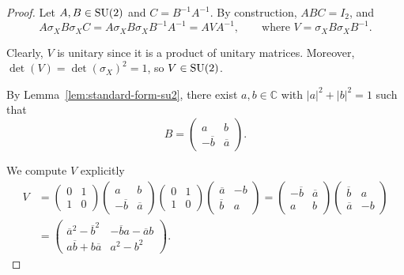 \documentclass[a4paper, oneside, 12pt]{amsart}
\begin{document}
\begin{proof}
  Let \( A, B \in \operatorname{SU}(2) \) and \( C = B^{-1} A^{-1} \).
  By construction, \( ABC = I_2 \), and
  \begin{equation*}
    A \sigma_X B \sigma_X C
    = A \sigma_X B \sigma_X B^{-1} A^{-1}
    = A V A^{-1}, \qquad \text{where } V = \sigma_X B \sigma_X B^{-1}.
  \end{equation*}

  Clearly, \( V \) is unitary since it is a product of unitary matrices. Moreover, \( \det(V) = \det(\sigma_X)^2 = 1 \), so \( V \in \operatorname{SU}(2) \).

  By Lemma~\ref{lem:standard-form-su2}, there exist \( a, b \in \mathbb{C} \) with \( |a|^2 + |b|^2 = 1 \) such that
  \begin{equation*}
    B = \begin{pmatrix} a & b \\ -\overline{b} & \overline{a} \end{pmatrix}.
  \end{equation*}

  We compute \( V \) explicitly
  \begin{align*}
    V & =
        \begin{pmatrix} 0 & 1 \\ 1 & 0 \end{pmatrix}
        \begin{pmatrix} a & b \\ -\overline{b} & \overline{a} \end{pmatrix}
        \begin{pmatrix} 0 & 1 \\ 1 & 0 \end{pmatrix}
        \begin{pmatrix} \overline{a} & -b \\ \overline{b} & a \end{pmatrix}
        =
        \begin{pmatrix} -\overline{b} & \overline{a} \\ a & b \end{pmatrix}
        \begin{pmatrix} \overline{b} & a \\ \overline{a} & -b \end{pmatrix} \\
      & =
        \begin{pmatrix}
          \overline{a}^2 - \overline{b}^2 & -\overline{b}a - \overline{a}b \\
          a\overline{b} + b\overline{a} & a^2 - b^2
        \end{pmatrix}.
  \end{align*}


\end{proof}
\end{document}
